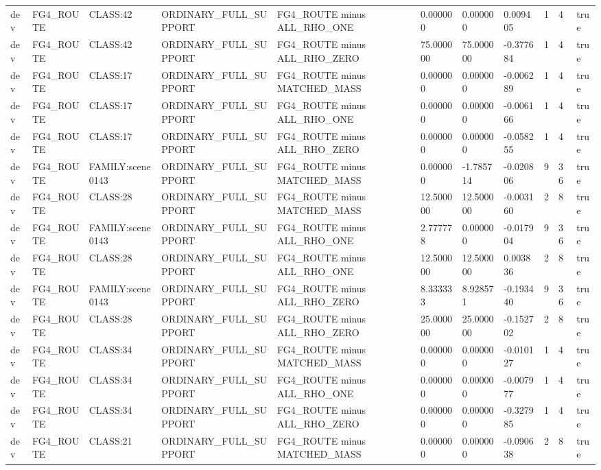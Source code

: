 \begin{tabular}{lllllllllll}
dev & FG4\_ROUTE & CLASS:42 & ORDINARY\_FULL\_SUPPORT & FG4\_ROUTE minus ALL\_RHO\_ONE & 0.000000 & 0.000000 & 0.009405 & 1 & 4 & true \\
dev & FG4\_ROUTE & CLASS:42 & ORDINARY\_FULL\_SUPPORT & FG4\_ROUTE minus ALL\_RHO\_ZERO & 75.000000 & 75.000000 & -0.377684 & 1 & 4 & true \\
dev & FG4\_ROUTE & CLASS:17 & ORDINARY\_FULL\_SUPPORT & FG4\_ROUTE minus MATCHED\_MASS & 0.000000 & 0.000000 & -0.006289 & 1 & 4 & true \\
dev & FG4\_ROUTE & CLASS:17 & ORDINARY\_FULL\_SUPPORT & FG4\_ROUTE minus ALL\_RHO\_ONE & 0.000000 & 0.000000 & -0.006166 & 1 & 4 & true \\
dev & FG4\_ROUTE & CLASS:17 & ORDINARY\_FULL\_SUPPORT & FG4\_ROUTE minus ALL\_RHO\_ZERO & 0.000000 & 0.000000 & -0.058255 & 1 & 4 & true \\
dev & FG4\_ROUTE & FAMILY:scene0143 & ORDINARY\_FULL\_SUPPORT & FG4\_ROUTE minus MATCHED\_MASS & 0.000000 & -1.785714 & -0.020806 & 9 & 36 & true \\
dev & FG4\_ROUTE & CLASS:28 & ORDINARY\_FULL\_SUPPORT & FG4\_ROUTE minus MATCHED\_MASS & 12.500000 & 12.500000 & -0.003160 & 2 & 8 & true \\
dev & FG4\_ROUTE & FAMILY:scene0143 & ORDINARY\_FULL\_SUPPORT & FG4\_ROUTE minus ALL\_RHO\_ONE & 2.777778 & 0.000000 & -0.017904 & 9 & 36 & true \\
dev & FG4\_ROUTE & CLASS:28 & ORDINARY\_FULL\_SUPPORT & FG4\_ROUTE minus ALL\_RHO\_ONE & 12.500000 & 12.500000 & 0.003836 & 2 & 8 & true \\
dev & FG4\_ROUTE & FAMILY:scene0143 & ORDINARY\_FULL\_SUPPORT & FG4\_ROUTE minus ALL\_RHO\_ZERO & 8.333333 & 8.928571 & -0.193440 & 9 & 36 & true \\
dev & FG4\_ROUTE & CLASS:28 & ORDINARY\_FULL\_SUPPORT & FG4\_ROUTE minus ALL\_RHO\_ZERO & 25.000000 & 25.000000 & -0.152702 & 2 & 8 & true \\
dev & FG4\_ROUTE & CLASS:34 & ORDINARY\_FULL\_SUPPORT & FG4\_ROUTE minus MATCHED\_MASS & 0.000000 & 0.000000 & -0.010127 & 1 & 4 & true \\
dev & FG4\_ROUTE & CLASS:34 & ORDINARY\_FULL\_SUPPORT & FG4\_ROUTE minus ALL\_RHO\_ONE & 0.000000 & 0.000000 & -0.007977 & 1 & 4 & true \\
dev & FG4\_ROUTE & CLASS:34 & ORDINARY\_FULL\_SUPPORT & FG4\_ROUTE minus ALL\_RHO\_ZERO & 0.000000 & 0.000000 & -0.327985 & 1 & 4 & true \\
dev & FG4\_ROUTE & CLASS:21 & ORDINARY\_FULL\_SUPPORT & FG4\_ROUTE minus MATCHED\_MASS & 0.000000 & 0.000000 & -0.090638 & 2 & 8 & true \\

\end{tabular}
